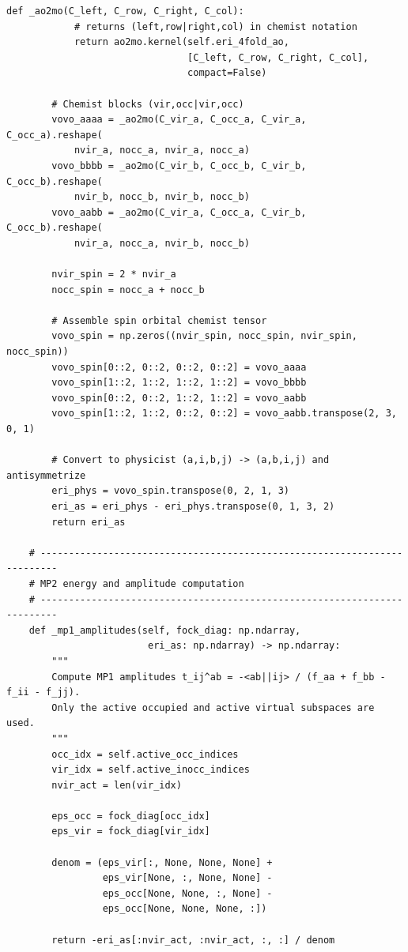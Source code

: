 \begin{lstlisting}[style=python, caption={...}, label=lst:full_code]
        def _ao2mo(C_left, C_row, C_right, C_col):
            # returns (left,row|right,col) in chemist notation
            return ao2mo.kernel(self.eri_4fold_ao,
                                [C_left, C_row, C_right, C_col],
                                compact=False)

        # Chemist blocks (vir,occ|vir,occ)
        vovo_aaaa = _ao2mo(C_vir_a, C_occ_a, C_vir_a, C_occ_a).reshape(
            nvir_a, nocc_a, nvir_a, nocc_a)
        vovo_bbbb = _ao2mo(C_vir_b, C_occ_b, C_vir_b, C_occ_b).reshape(
            nvir_b, nocc_b, nvir_b, nocc_b)
        vovo_aabb = _ao2mo(C_vir_a, C_occ_a, C_vir_b, C_occ_b).reshape(
            nvir_a, nocc_a, nvir_b, nocc_b)

        nvir_spin = 2 * nvir_a
        nocc_spin = nocc_a + nocc_b

        # Assemble spin orbital chemist tensor
        vovo_spin = np.zeros((nvir_spin, nocc_spin, nvir_spin, nocc_spin))
        vovo_spin[0::2, 0::2, 0::2, 0::2] = vovo_aaaa
        vovo_spin[1::2, 1::2, 1::2, 1::2] = vovo_bbbb
        vovo_spin[0::2, 0::2, 1::2, 1::2] = vovo_aabb
        vovo_spin[1::2, 1::2, 0::2, 0::2] = vovo_aabb.transpose(2, 3, 0, 1)

        # Convert to physicist (a,i,b,j) -> (a,b,i,j) and antisymmetrize
        eri_phys = vovo_spin.transpose(0, 2, 1, 3)
        eri_as = eri_phys - eri_phys.transpose(0, 1, 3, 2)
        return eri_as

    # -------------------------------------------------------------------------
    # MP2 energy and amplitude computation
    # -------------------------------------------------------------------------
    def _mp1_amplitudes(self, fock_diag: np.ndarray,
                         eri_as: np.ndarray) -> np.ndarray:
        """
        Compute MP1 amplitudes t_ij^ab = -<ab||ij> / (f_aa + f_bb - f_ii - f_jj).
        Only the active occupied and active virtual subspaces are used.
        """
        occ_idx = self.active_occ_indices
        vir_idx = self.active_inocc_indices
        nvir_act = len(vir_idx)

        eps_occ = fock_diag[occ_idx]
        eps_vir = fock_diag[vir_idx]

        denom = (eps_vir[:, None, None, None] +
                 eps_vir[None, :, None, None] -
                 eps_occ[None, None, :, None] -
                 eps_occ[None, None, None, :])

        return -eri_as[:nvir_act, :nvir_act, :, :] / denom


\end{lstlisting}
